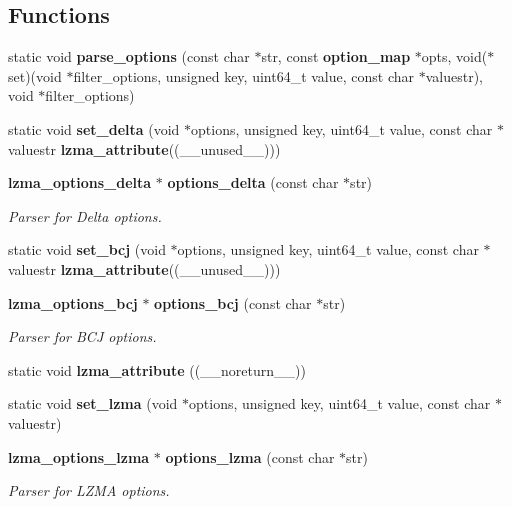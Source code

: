 \subsection*{Functions}
\begin{DoxyCompactItemize}
\item 
static void \textbf{ parse\+\_\+options} (const char $\ast$str, const \textbf{ option\+\_\+map} $\ast$opts, void($\ast$set)(void $\ast$filter\+\_\+options, unsigned key, uint64\+\_\+t value, const char $\ast$valuestr), void $\ast$filter\+\_\+options)
\item 
\mbox{\label{options_8c_ac3913d1fbeefd478d996e2c2a34a9c9c}} 
static void {\bfseries set\+\_\+delta} (void $\ast$options, unsigned key, uint64\+\_\+t value, const char $\ast$valuestr \textbf{ lzma\+\_\+attribute}((\+\_\+\+\_\+unused\+\_\+\+\_\+)))
\item 
\textbf{ lzma\+\_\+options\+\_\+delta} $\ast$ \textbf{ options\+\_\+delta} (const char $\ast$str)
\begin{DoxyCompactList}\small\item\em Parser for Delta options. \end{DoxyCompactList}\item 
\mbox{\label{options_8c_af6b8ba410f28688130095e704aad6172}} 
static void {\bfseries set\+\_\+bcj} (void $\ast$options, unsigned key, uint64\+\_\+t value, const char $\ast$valuestr \textbf{ lzma\+\_\+attribute}((\+\_\+\+\_\+unused\+\_\+\+\_\+)))
\item 
\textbf{ lzma\+\_\+options\+\_\+bcj} $\ast$ \textbf{ options\+\_\+bcj} (const char $\ast$str)
\begin{DoxyCompactList}\small\item\em Parser for B\+CJ options. \end{DoxyCompactList}\item 
\mbox{\label{options_8c_a1957d0c8f6ec2eb4950e67226425ee7c}} 
static void {\bfseries lzma\+\_\+attribute} ((\+\_\+\+\_\+noreturn\+\_\+\+\_\+))
\item 
\mbox{\label{options_8c_a16b1232f2f40a8a9a96cc5985898a58d}} 
static void {\bfseries set\+\_\+lzma} (void $\ast$options, unsigned key, uint64\+\_\+t value, const char $\ast$valuestr)
\item 
\textbf{ lzma\+\_\+options\+\_\+lzma} $\ast$ \textbf{ options\+\_\+lzma} (const char $\ast$str)
\begin{DoxyCompactList}\small\item\em Parser for L\+Z\+MA options. \end{DoxyCompactList}\end{DoxyCompactItemize}


